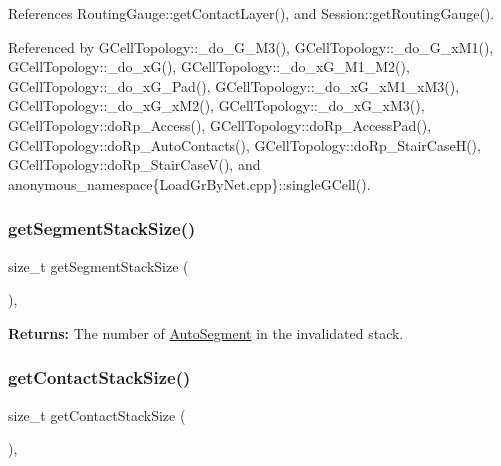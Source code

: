 References Routing\+Gauge\+::get\+Contact\+Layer(), and Session\+::get\+Routing\+Gauge().



Referenced by G\+Cell\+Topology\+::\+\_\+do\+\_\+G\+\_\+M3(), G\+Cell\+Topology\+::\+\_\+do\+\_\+G\+\_\+x\+M1(), G\+Cell\+Topology\+::\+\_\+do\+\_\+x\+G(), G\+Cell\+Topology\+::\+\_\+do\+\_\+x\+G\+\_\+M1\+\_\+M2(), G\+Cell\+Topology\+::\+\_\+do\+\_\+x\+G\+\_\+Pad(), G\+Cell\+Topology\+::\+\_\+do\+\_\+x\+G\+\_\+x\+M1\+\_\+x\+M3(), G\+Cell\+Topology\+::\+\_\+do\+\_\+x\+G\+\_\+x\+M2(), G\+Cell\+Topology\+::\+\_\+do\+\_\+x\+G\+\_\+x\+M3(), G\+Cell\+Topology\+::do\+Rp\+\_\+\+Access(), G\+Cell\+Topology\+::do\+Rp\+\_\+\+Access\+Pad(), G\+Cell\+Topology\+::do\+Rp\+\_\+\+Auto\+Contacts(), G\+Cell\+Topology\+::do\+Rp\+\_\+\+Stair\+Case\+H(), G\+Cell\+Topology\+::do\+Rp\+\_\+\+Stair\+Case\+V(), and anonymous\+\_\+namespace\{\+Load\+Gr\+By\+Net.\+cpp\}\+::single\+G\+Cell().

\mbox{\label{classKatabatic_1_1Session_ac9c144a8faf97714069824933970923c}} 
\subsubsection{\texorpdfstring{get\+Segment\+Stack\+Size()}{getSegmentStackSize()}}
{\footnotesize\ttfamily size\+\_\+t get\+Segment\+Stack\+Size (\begin{DoxyParamCaption}{ }\end{DoxyParamCaption})\hspace{0.3cm}{\ttfamily [inline]}, {\ttfamily [static]}}

{\bfseries Returns\+:} The number of \mbox{\hyperlink{classKatabatic_1_1AutoSegment}{Auto\+Segment}} in the invalidated stack. \mbox{\label{classKatabatic_1_1Session_a0d0c0159030a32b78ab4ad2b58871bce}} 
\subsubsection{\texorpdfstring{get\+Contact\+Stack\+Size()}{getContactStackSize()}}
{\footnotesize\ttfamily size\+\_\+t get\+Contact\+Stack\+Size (\begin{DoxyParamCaption}{ }\end{DoxyParamCaption})\hspace{0.3cm}{\ttfamily [inline]}, {\ttfamily [static]}}

